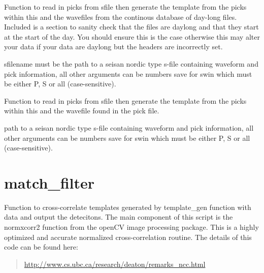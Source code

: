 \documentclass[a4paper,10pt,english]{sphinxmanual}
\begin{document}

\begin{fulllineitems}
\label{modules:template_gen.from_contbase}
Function to read in picks from sfile then generate the template from the
picks within this and the wavefiles from the continous database of day-long
files.  Included is a section to sanity check that the files are daylong and
that they start at the start of the day.  You should ensure this is the case
otherwise this may alter your data if your data are daylong but the headers
are incorrectly set.
\begin{quote}\begin{description}
\end{description}\end{quote}

sfilename must be the
path to a seisan nordic type s-file containing waveform and pick
information, all other arguments can be numbers save for swin which must
be either P, S or all (case-sensitive).

\end{fulllineitems}


\begin{fulllineitems}
\label{modules:template_gen.from_sfile}
Function to read in picks from sfile then generate the template from the
picks within this and the wavefile found in the pick file.
\begin{quote}\begin{description}
\end{description}\end{quote}

path to a seisan nordic type s-file containing waveform and pick
information, all other arguments can be numbers save for swin which must
be either P, S or all (case-sensitive).

\end{fulllineitems}



\section{match\_filter}
\label{modules:match-filter}\label{modules:module-match_filter}
Function to cross-correlate templates generated by template\_gen function with
data and output the detecitons.  The main component of this script is the
normxcorr2 function from the openCV image processing package.  This is a highly
optimized and accurate normalized cross-correlation routine.  The details of
this code can be found here:
\begin{quote}

\href{http://www.cs.ubc.ca/research/deaton/remarks\_ncc.html}{http://www.cs.ubc.ca/research/deaton/remarks\_ncc.html}
\end{quote}
\end{document}
